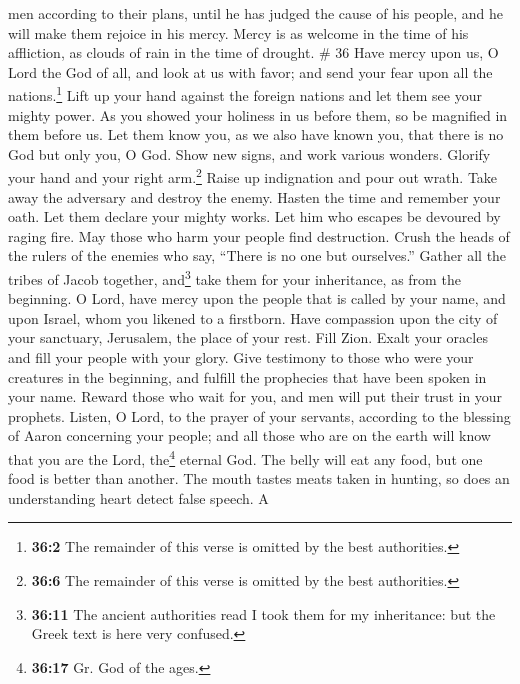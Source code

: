 men according to their plans, until he has judged the cause of his
people, and he will make them rejoice in his mercy. 
Mercy is as welcome in the time of his affliction, as clouds of rain in
the time of drought. \# 36  Have mercy upon us, O Lord the
God of all, and look at us with favor;  and send your fear
upon all the nations.\footnote{\textbf{36:2} The remainder of this verse
  is omitted by the best authorities.}  Lift up your hand
against the foreign nations and let them see your mighty power.
 As you showed your holiness in us before them, so be
magnified in them before us.  Let them know you, as we
also have known you, that there is no God but only you, O God.
 Show new signs, and work various wonders. Glorify your
hand and your right arm.\footnote{\textbf{36:6} The remainder of this
  verse is omitted by the best authorities.}  Raise up
indignation and pour out wrath. Take away the adversary and destroy the
enemy.  Hasten the time and remember your oath. Let them
declare your mighty works.  Let him who escapes be
devoured by raging fire. May those who harm your people find
destruction.  Crush the heads of the rulers of the
enemies who say, ``There is no one but ourselves.'' 
Gather all the tribes of Jacob together, and\footnote{\textbf{36:11} The
  ancient authorities read I took them for my inheritance: but the Greek
  text is here very confused.} take them for your inheritance, as from
the beginning.  O Lord, have mercy upon the people that
is called by your name, and upon Israel, whom you likened to a
firstborn.  Have compassion upon the city of your
sanctuary, Jerusalem, the place of your rest.  Fill Zion.
Exalt your oracles and fill your people with your glory. 
Give testimony to those who were your creatures in the beginning, and
fulfill the prophecies that have been spoken in your name.
 Reward those who wait for you, and men will put their
trust in your prophets.  Listen, O Lord, to the prayer of
your servants, according to the blessing of Aaron concerning your
people; and all those who are on the earth will know that you are the
Lord, the\footnote{\textbf{36:17} Gr. God of the ages.} eternal God.
 The belly will eat any food, but one food is better than
another.  The mouth tastes meats taken in hunting, so
does an understanding heart detect false speech.  A
